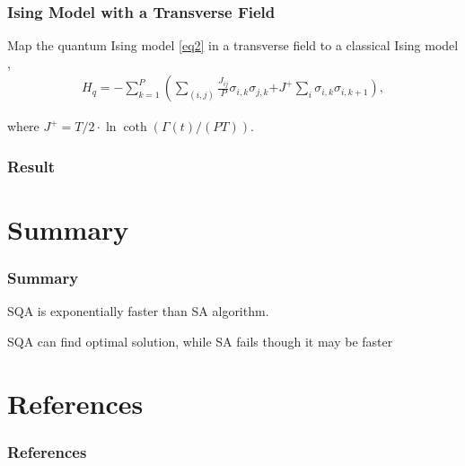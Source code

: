\documentclass[11pt,compress,mathserif]{beamer}
\begin{document}
\begin{frame}\frametitle{Ising Model with a Transverse Field}

\bit

\item Map the quantum Ising model \eqref{eq2} in a transverse field to a classical Ising model \cite{martovnak2002quantum}, 
\begin{align}
H_{q}=-\sum_{k=1}^{P}\left(\sum_{(i, j)} \frac{J_{i j}}{P} \sigma_{i, k} \sigma_{j, k}\right. \left.+J^{+} \sum_{i} \sigma_{i, k} \sigma_{i, k+1}\right),
\end{align}

where $J^{+}=T / 2 \cdot \ln \operatorname{coth}(\Gamma(t) /(P T))$.


\eit

\end{frame}


\begin{frame}\frametitle{Result}



\end{frame}


\section[Summary]{Summary}

\begin{frame}\frametitle{Summary}

\bit
\item SQA is exponentially faster than SA algorithm.

\vspace{0.5cm}

\item SQA can find optimal solution, while SA fails though it may be faster

\eit

\end{frame}


\section[Ref]{References}

\begin{frame}\frametitle{References}
\tiny



\end{frame}


\end{document}
